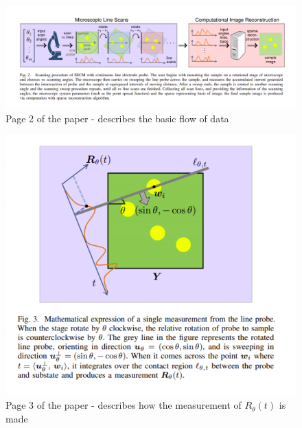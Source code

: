 \documentclass[fleqn, 11pt]{article}
\begin{document}
\begin{figure}[H]
   \includegraphics[scale=0.35]{Q6_Pg2.png}
   \caption{Page 2 of the paper - describes the basic flow of data}
\end{figure}
\begin{figure}[H]
   \includegraphics[scale=0.4]{Q6_Pg3.png}
  \caption{Page 3 of the paper - describes how the measurement of $R_\theta(t)$ is made}
\end{figure}
\end{document}
